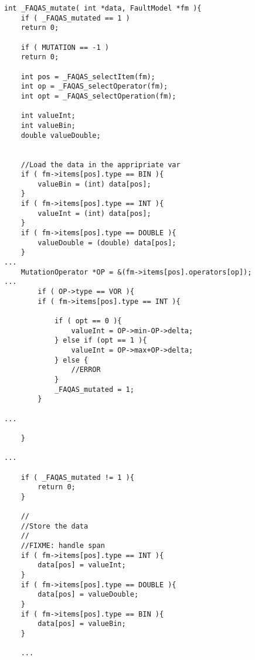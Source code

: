 
\begin{minipage}{15cm}
\begin{lstlisting}[style=CStyle, caption=Mutation probe., label=mutationProbe, mathescape=true]
int _FAQAS_mutate( int *data, FaultModel *fm ){
    if ( _FAQAS_mutated == 1 )
    return 0;

    if ( MUTATION == -1 )
    return 0;

    int pos = _FAQAS_selectItem(fm);
    int op = _FAQAS_selectOperator(fm);
    int opt = _FAQAS_selectOperation(fm);

    int valueInt;
    int valueBin;
    double valueDouble;


    //Load the data in the appripriate var
    if ( fm->items[pos].type == BIN ){
        valueBin = (int) data[pos];
    }
    if ( fm->items[pos].type == INT ){
        valueInt = (int) data[pos];
    }
    if ( fm->items[pos].type == DOUBLE ){
        valueDouble = (double) data[pos];
    }
...
    MutationOperator *OP = &(fm->items[pos].operators[op]);    
...     
        if ( OP->type == VOR ){
        if ( fm->items[pos].type == INT ){

            if ( opt == 0 ){
                valueInt = OP->min-OP->delta;
            } else if (opt == 1 ){
                valueInt = OP->max+OP->delta;
            } else {
                //ERROR
            }
            _FAQAS_mutated = 1;
        }

...

    }

...

    if ( _FAQAS_mutated != 1 ){
        return 0;
    }

    //
    //Store the data
    //
    //FIXME: handle span
    if ( fm->items[pos].type == INT ){
        data[pos] = valueInt;
    }
    if ( fm->items[pos].type == DOUBLE ){
        data[pos] = valueDouble;
    }
    if ( fm->items[pos].type == BIN ){
        data[pos] = valueBin;
    }
    
    ...

    
\end{lstlisting}
\end{minipage}

